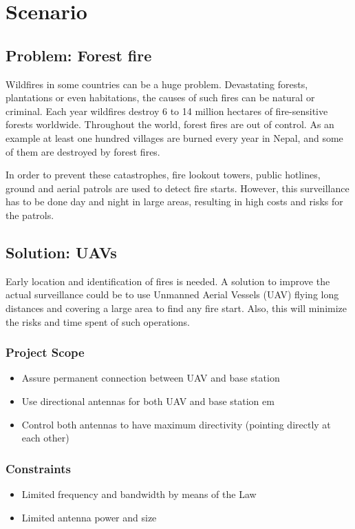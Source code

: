 \chapter*{Scenario}\label{ch:scenario}

\section*{Problem: Forest fire}
Wildfires in some countries can be a huge problem. Devastating forests, plantations or even habitations, the causes of such fires can be natural or criminal.
Each year wildfires destroy 6 to 14 million hectares of fire-sensitive forests worldwide. Throughout the world, forest fires are out of control. As an example at least one hundred villages are burned every year in Nepal, and some of them are destroyed by forest fires.

In order to prevent these catastrophes, fire lookout towers, public hotlines, ground and aerial patrols are used to detect fire starts. However, this surveillance has to be done day and night in large areas, resulting in high costs and risks for the patrols.

\section*{Solution: UAVs}
Early location and identification of fires is needed. A solution to improve the actual surveillance could be to use Unmanned Aerial Vessels (UAV) flying long distances and covering a large area to find any fire start. Also, this will minimize the risks and time spent of such operations. 

\subsection*{Project Scope}
\begin{itemize}  
        \item{Assure permanent connection between UAV and base station}
        \item Use directional antennas for both UAV and base station em 
        \item Control both antennas to have maximum directivity (pointing directly at each other)
\end{itemize}

\subsection*{Constraints}
\begin{itemize}  
        \item{Limited frequency and bandwidth by means of the Law}
        \item{Limited antenna power and size}
\end{itemize}

